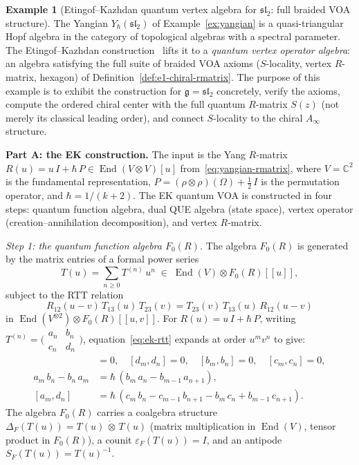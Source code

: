 \documentclass[11pt,reqno]{amsart}
\theoremstyle{definition}
\newtheorem{example}[theorem]{Example}
\theoremstyle{remark}
\newcommand{\Ainf}{A_{\infty}}
\DeclareMathOperator{\End}{End}
\newcommand{\fg}{\mathfrak{g}}
\newcommand{\CC}{\mathbb{C}}
\numberwithin{equation}{section}
\begin{document}
\begin{example}[Etingof--Kazhdan quantum vertex algebra for
$\mathfrak{sl}_2$: full braided VOA structure]
\label{ex:ek-qvoa}
The Yangian $Y_\hbar(\mathfrak{sl}_2)$ of
Example~\ref{ex:yangian} is a quasi-triangular Hopf algebra
in the category of topological algebras with a spectral
parameter. The Etingof--Kazhdan construction~\cite{EK00}
lifts it to a \emph{quantum vertex operator algebra}:
an algebra satisfying the full suite of braided VOA axioms
($S$-locality, vertex $R$-matrix, hexagon) of
Definition~\ref{def:e1-chiral-rmatrix}.
The purpose of this example is to exhibit the construction
for $\fg = \mathfrak{sl}_2$ concretely, verify the axioms,
compute the ordered chiral center with the full quantum
$R$-matrix $S(z)$ (not merely its classical leading order),
and connect $S$-locality to the chiral $\Ainf$ structure.

\medskip
\noindent
\textbf{Part A: the EK construction.}
The input is the Yang $R$-matrix
$R(u) = u\,I + \hbar\,P \in \End(V \otimes V)[u]$
from~\eqref{eq:yangian-rmatrix}, where
$V = \CC^2$ is the fundamental representation,
$P = (\rho \otimes \rho)(\Omega) + \tfrac{1}{2}\,I$ is the
permutation operator, and $\hbar = 1/(k+2)$.
The EK quantum VOA is constructed in four steps:
quantum function algebra, dual QUE algebra (state space),
vertex operator (creation--annihilation decomposition), and
vertex $R$-matrix.

\smallskip
\noindent\emph{Step 1: the quantum function algebra $F_0(R)$.}
The algebra $F_0(R)$ is generated by the matrix entries
of a formal power series
\begin{equation}\label{eq:ek-transfer}
  T(u) = \sum_{n \geq 0} T^{(n)}\, u^n
  \;\in\; \End(V) \otimes F_0(R)[\![u]\!],
\end{equation}
subject to the RTT relation
\begin{equation}\label{eq:ek-rtt}
  R_{12}(u - v)\,T_{13}(u)\,T_{23}(v)
  = T_{23}(v)\,T_{13}(u)\,R_{12}(u - v)
\end{equation}
in $\End(V^{\otimes 2}) \otimes F_0(R)[\![u, v]\!]$.
For $R(u) = u\,I + \hbar\,P$, writing
$T^{(n)} = \bigl(\begin{smallmatrix}
  a_n & b_n \\ c_n & d_n
\end{smallmatrix}\bigr)$, equation~\eqref{eq:ek-rtt}
expands at order $u^m v^n$ to give:
\begin{align}
  [a_m, a_n] &= 0, \quad [d_m, d_n] = 0,
  \quad [b_m, b_n] = 0, \quad [c_m, c_n] = 0,
  \label{eq:ek-diag}\\
  a_m\,b_n - b_n\,a_m
  &= \hbar\,(b_m\,a_n - b_{m-1}\,a_{n+1}),
  \label{eq:ek-cross-ab}\\
  [a_m, d_n] &= \hbar\,(c_m\,b_n - c_{m-1}\,b_{n+1}
  - b_m\,c_n + b_{m-1}\,c_{n+1}).
  \label{eq:ek-cross-ad}
\end{align}
The algebra $F_0(R)$ carries a coalgebra structure
$\Delta_F(T(u)) = T(u)\,\dot{\otimes}\,T(u)$ (matrix
multiplication in $\End(V)$, tensor product in $F_0(R)$),
a counit $\varepsilon_F(T(u)) = I$, and an antipode
$S_F(T(u)) = T(u)^{-1}$.


\end{example}
\end{document}
